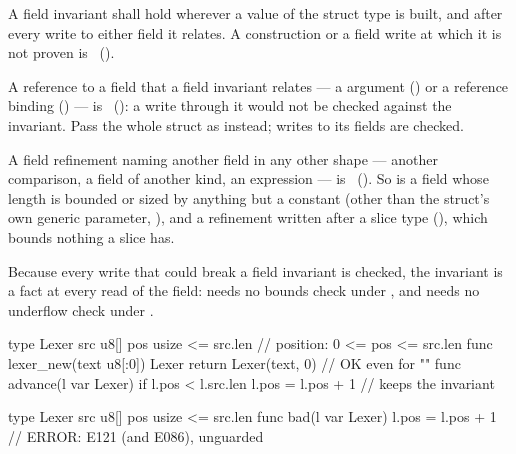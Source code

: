 \begin{constraint}
  A field invariant shall hold wherever a value of the struct type is built, and after every
  write to either field it relates. A construction or a field write at which it is not proven is
  \illformed{}~().
\end{constraint}

\begin{constraint}
  A  reference to a field that a field invariant relates --- a  argument
  () or a reference binding () --- is
  \illformed{}~(): a write through it would not be checked against the invariant.
  Pass the whole struct as  instead; writes to its fields are checked.
\end{constraint}

\begin{constraint}
  A field refinement naming another field in any other shape --- another comparison, a field of
  another kind, an expression --- is \illformed{}~().  So is a field whose length
  is bounded or sized by anything but a constant (other than the struct's own generic parameter,
  ), and a refinement written after a slice type
  (), which bounds nothing a slice has.
\end{constraint}

\pnum
Because every write that could break a field invariant is checked, the invariant is a fact at
every read of the field:  needs no bounds check under
, and  needs no underflow check under
.

\begin{example}
\begin{laincode}
type Lexer {
    src u8[]
    pos usize <= src.len         // position: 0 <= pos <= src.len
}
func lexer_new(text u8[:0]) Lexer { return Lexer(text, 0) }   // OK even for ""
func advance(l var Lexer) {
    if l.pos < l.src.len { l.pos = l.pos + 1 }                 // keeps the invariant
}
\end{laincode}
\begin{laincode}
type Lexer {
    src u8[]
    pos usize <= src.len
}
func bad(l var Lexer) { l.pos = l.pos + 1 }   // ERROR: E121 (and E086), unguarded
\end{laincode}
\end{example}

